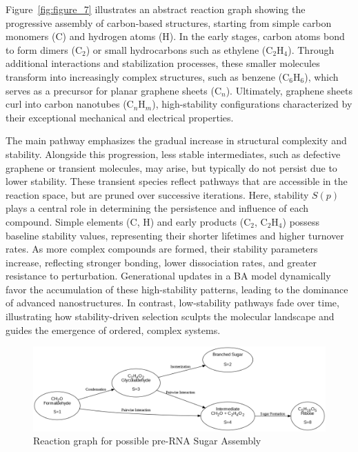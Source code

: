 \documentclass[preprint,12pt]{elsarticle}
\begin{document}
Figure~\ref{fig:figure_7} illustrates an abstract reaction graph showing the progressive assembly of carbon-based structures, starting from simple carbon monomers (\( \text{C} \)) and hydrogen atoms (\( \text{H} \)). In the early stages, carbon atoms bond to form dimers (\( \text{C}_2 \)) or small hydrocarbons such as ethylene (\( \text{C}_2\text{H}_4 \)). Through additional interactions and stabilization processes, these smaller molecules transform into increasingly complex structures, such as benzene (\( \text{C}_6\text{H}_6 \)), which serves as a precursor for planar graphene sheets (\( \text{C}_n \)). Ultimately, graphene sheets curl into carbon nanotubes (\( \text{C}_n\text{H}_m \)), high-stability configurations characterized by their exceptional mechanical and electrical properties. 

The main pathway emphasizes the gradual increase in structural complexity and stability. Alongside this progression, less stable intermediates, such as defective graphene or transient molecules, may arise, but typically do not persist due to lower stability. These transient species reflect pathways that are accessible in the reaction space, but are pruned over successive iterations. Here, stability \( S(p) \) plays a central role in determining the persistence and influence of each compound. Simple elements (\( \text{C} \), \( \text{H} \)) and early products (\( \text{C}_2 \), \( \text{C}_2\text{H}_4 \)) possess baseline stability values, representing their shorter lifetimes and higher turnover rates. As more complex compounds are formed, their stability parameters increase, reflecting stronger bonding, lower dissociation rates, and greater resistance to perturbation. Generational updates in a BA model dynamically favor the accumulation of these high-stability patterns, leading to the dominance of advanced nanostructures. In contrast, low-stability pathways fade over time, illustrating how stability-driven selection sculpts the molecular landscape and guides the emergence of ordered, complex systems.


\begin{figure}[h]
    \centering
    \includegraphics[width=1\textwidth,height=0.4\textwidth]{figure_8.png}
    \caption{Reaction graph for possible pre-RNA Sugar Assembly}
    \label{fig:figure_8}
\end{figure}
\end{document}
